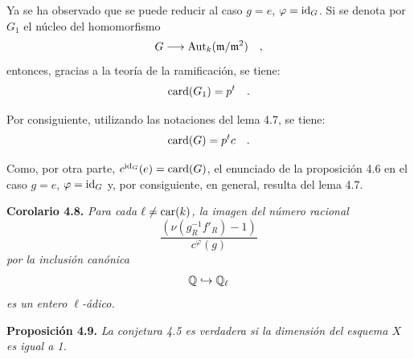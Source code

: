 \medskip

\begin{prooftext}
Ya se ha observado que se puede reducir al caso $g = e$, $\varphi = \operatorname{id}_G$. Si se denota por $G_1$ el núcleo del homomorfismo
\[
G \longrightarrow \operatorname{Aut}_k(\mathfrak m/\mathfrak m^2) \quad ,
\]
entonces, gracias a la teoría de la ramificación, se tiene:
\[
\operatorname{card}(G_1) = p^t \quad .
\]

Por consiguiente, utilizando las notaciones del lema 4.7, se tiene:
\[
\operatorname{card}(G) = p^t c \quad .
\]

Como, por otra parte, $c^{\operatorname{id}_G}(e) = \operatorname{card}(G)$, el enunciado de la proposición 4.6 en el caso $g = e$, $\varphi = \operatorname{id}_G$ y, por consiguiente, en general, resulta del lema 4.7.
\end{prooftext}

\medskip
\noindent
\textbf{Corolario 4.8.} \emph{Para cada $\ell \neq \operatorname{car}(k)$, la imagen del número racional
\[
\frac{(\nu(g_R^{-1}f'_R) - 1)}{c^\varphi(g)}
\]
por la inclusión canónica
\[
\mathbb Q \hookrightarrow \mathbb Q_\ell
\]
es un entero $\ell$-ádico.}

\medskip
\noindent
\textbf{Proposición 4.9.} \emph{La conjetura 4.5 es verdadera si la dimensión del esquema $X$ es igual a 1.}
